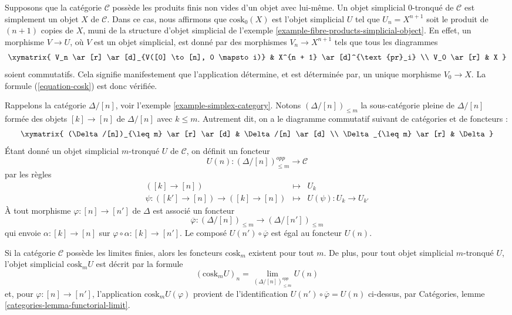 \begin{example}
\label{example-cosk0}
Supposons que la catégorie $\mathcal{C}$ possède les produits finis non
vides d'un objet avec lui-même. Un objet simplicial $0$-tronqué de
$\mathcal{C}$ est simplement un objet $X$ de $\mathcal{C}$. Dans ce cas,
nous affirmons que $\text{cosk}_0(X)$ est l'objet simplicial $U$ tel que
$U_n = X^{n + 1}$ soit le produit de $(n + 1)$ copies de $X$, muni de la
structure d'objet simplicial de l'exemple
\ref{example-fibre-products-simplicial-object}. En effet, un morphisme
$V \to U$, où $V$ est un objet simplicial, est donné par des morphismes
$V_n \to X^{n + 1}$ tels que tous les diagrammes
$$
\xymatrix{
V_n \ar[r] \ar[d]_{V([0] \to [n], 0 \mapsto i)} &
X^{n + 1} \ar[d]^{\text{pr}_i} \\
V_0 \ar[r] &
X
}
$$
soient commutatifs. Cela signifie manifestement que l'application
détermine, et est déterminée par, un unique morphisme $V_0 \to X$.
La formule (\ref{equation-cosk}) est donc vérifiée.
\end{example}

\noindent
Rappelons la catégorie $\Delta/[n]$, voir l'exemple
\ref{example-simplex-category}. Notons $(\Delta/[n])_{\leq m}$ la
sous-catégorie pleine de $\Delta/[n]$ formée des objets
$[k] \to [n]$ de $\Delta/[n]$ avec $k \leq m$. Autrement dit, on a le diagramme
commutatif suivant de catégories et de foncteurs :
$$
\xymatrix{
(\Delta/[n])_{\leq m} \ar[r] \ar[d] &
\Delta/[n] \ar[d] \\
\Delta_{\leq m} \ar[r] &
\Delta
}
$$
Étant donné un objet simplicial $m$-tronqué $U$ de $\mathcal{C}$,
on définit un foncteur
$$
U(n) : (\Delta/[n])_{\leq m}^{opp} \longrightarrow \mathcal{C}
$$
par les règles
\begin{eqnarray*}
([k] \to [n]) & \longmapsto & U_k \\
\psi : ([k'] \to [n]) \to ([k] \to [n]) &
\longmapsto &
U(\psi) : U_k \to U_{k'}
\end{eqnarray*}
À tout morphisme $\varphi : [n] \to [n']$ de $\Delta$ est associé un foncteur
$$
\overline{\varphi} :
(\Delta/[n])_{\leq m}
\longrightarrow
(\Delta/[n'])_{\leq m}
$$
qui envoie $\alpha : [k] \to [n]$ sur
$\varphi \circ \alpha : [k] \to [n']$. Le composé
$U(n') \circ \overline{\varphi}$ est égal au foncteur $U(n)$.

\begin{lemma}
\label{lemma-existence-cosk}
Si la catégorie $\mathcal{C}$ possède les limites finies, alors les
foncteurs $\text{cosk}_m$ existent pour tout $m$. De plus, pour tout
objet simplicial $m$-tronqué $U$, l'objet simplicial
$\text{cosk}_mU$ est décrit par la formule
$$
(\text{cosk}_mU)_n = \lim_{(\Delta/[n])_{\leq m}^{opp}} U(n)
$$
et, pour $\varphi : [n] \to [n']$, l'application
$\text{cosk}_mU(\varphi)$ provient de l'identification
$U(n') \circ \overline{\varphi} = U(n)$ ci-dessus, par Catégories,
lemme \ref{categories-lemma-functorial-limit}.
\end{lemma}

